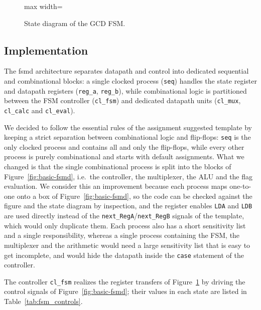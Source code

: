 \begin{figure}[H]
\begin{adjustbox}{max width=\linewidth}
\begin{tikzpicture}
    \end{tikzpicture}
    \end{adjustbox}
    \caption{State diagram of the GCD FSM.}
    \label{fig:gcd_fsm}
\end{figure}


\subsection{Implementation}

The fsmd architecture separates datapath and control into dedicated sequential and combinational blocks: a single clocked process (\texttt{seq}) handles the state register and datapath registers (\texttt{reg\_a}, \texttt{reg\_b}), while combinational logic is partitioned between the FSM controller (\texttt{cl\_fsm}) and dedicated datapath units (\texttt{cl\_mux}, \texttt{cl\_calc} and \texttt{cl\_eval}).


We decided to follow the essential rules of the assignment suggested template by keeping a strict separation between combinational logic and flip-flops: \texttt{seq} is the only clocked process and contains all and only the flip-flops, while every other process is purely combinational and starts with default assignments. What we changed is that the single combinational process is split into the blocks of Figure~\ref{fig:basic-fsmd}, i.e.\ the controller, the multiplexer, the ALU and the flag evaluation. We consider this an improvement because each process maps one-to-one onto a box of Figure~\ref{fig:basic-fsmd}, so the code can be checked against the figure and the state diagram by inspection, and the register enables \texttt{LDA} and \texttt{LDB} are used directly instead of the \texttt{next\_RegA}/\texttt{next\_RegB} signals of the template, which would only duplicate them. Each process also has a short sensitivity list and a single responsibility, whereas a single process containing the FSM, the multiplexer and the arithmetic would need a large sensitivity list that is easy to get incomplete, and would hide the datapath inside the \texttt{case} statement of the controller. 

The controller \texttt{cl\_fsm} realizes the register transfers of Figure~\ref{fig:gcd_fsm} by driving the control signals of Figure~\ref{fig:basic-fsmd}; their values in each state are listed in Table~\ref{tab:fsm_controls}.

